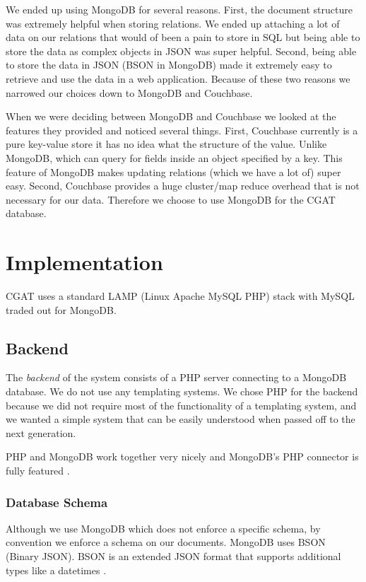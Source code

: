 \documentclass[10pt, conference, compsocconf]{IEEEtran}
\begin{document}
We ended up using MongoDB for several reasons. First, the document structure was extremely helpful when storing
relations. We ended up attaching a lot of data on our relations that would of been a pain to store in SQL but being
able to store the data as complex objects in JSON was super helpful. Second, being able to store the data in JSON
(BSON in MongoDB) made it extremely easy to retrieve and use the data in a web application. Because of these two reasons
we narrowed our choices down to MongoDB and Couchbase. 

When we were deciding between MongoDB and Couchbase we looked at the features they 
provided and noticed several things. First, Couchbase currently is a pure key-value store it has
no idea what the structure of the value. Unlike MongoDB, which can query for fields inside an 
object specified by a key. This feature of MongoDB makes updating relations (which we 
have a lot of) super easy. Second, Couchbase provides a huge
cluster/map reduce overhead that is not necessary for our data. Therefore we choose to use
MongoDB for the CGAT database.

\section{Implementation}\label{sec:implementation}
CGAT uses a standard LAMP (Linux Apache MySQL PHP) stack with MySQL traded out for MongoDB.

\subsection{Backend}
The \textit{backend} of the system consists of a PHP server connecting to a MongoDB database.
We do not use any templating systems.
We chose PHP for the backend because we did not require most of the functionality of a templating system, and we wanted a simple
system that can be easily understood when passed off to the next generation.

PHP and MongoDB work together very nicely and MongoDB's PHP connector is fully featured \cite{phpMongo}.

\subsubsection{Database Schema}
Although we use MongoDB which does not enforce a specific schema, by convention we enforce a schema on our documents.
MongoDB uses BSON (Binary JSON). BSON is an extended JSON format that supports additional types like a datetimes \cite{bson}.
\end{document}
